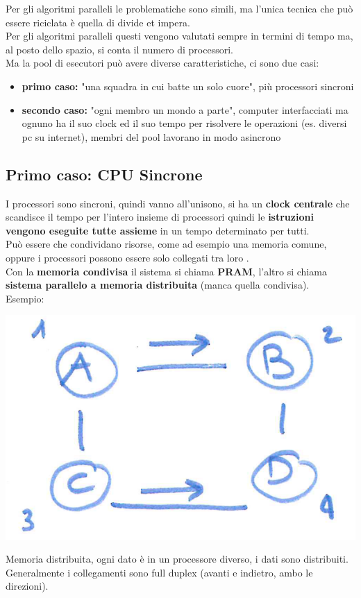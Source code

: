 \documentclass[11pt]{article}
\begin{document}
	Per gli algoritmi paralleli le problematiche sono simili, ma l'unica tecnica che può essere riciclata è quella di divide et impera.  \\
	Per gli algoritmi paralleli questi vengono valutati sempre in termini di tempo ma, al posto dello spazio, si conta il numero di processori. \\

	Ma la pool di esecutori può avere diverse caratteristiche, ci sono due casi: 
	\begin{itemize}
		\item \textbf{primo caso:} "una squadra in cui batte un solo cuore", più processori sincroni
		\item \textbf{secondo caso:} "ogni membro un mondo a parte", computer interfacciati ma ognuno ha il suo clock ed il suo tempo per risolvere le operazioni (es. diversi pc su internet), membri del pool lavorano in modo asincrono 
	\end{itemize}
	
	
	\subsection*{Primo caso: CPU Sincrone}
	 I processori sono sincroni, quindi vanno all'unisono, si ha un \textbf{clock centrale} che scandisce il tempo per l'intero insieme di processori quindi le \textbf{istruzioni vengono eseguite tutte assieme} in un tempo determinato per tutti.\\
	Può essere che condividano risorse, come ad esempio una memoria comune, oppure i processori possono essere solo collegati tra loro .\\

	Con la \textbf{memoria condivisa} il sistema si chiama \textbf{PRAM}, l'altro si chiama \textbf{sistema parallelo a memoria distribuita} (manca quella condivisa).\\
	
	Esempio: 
	\begin{center}
		\includegraphics[width=0.6\columnwidth]{img/somm1}
	\end{center}
	Memoria distribuita, ogni dato è in un processore diverso, i dati sono distribuiti. Generalmente i collegamenti sono full duplex (avanti e indietro, ambo le direzioni).\\
	
\end{document}
